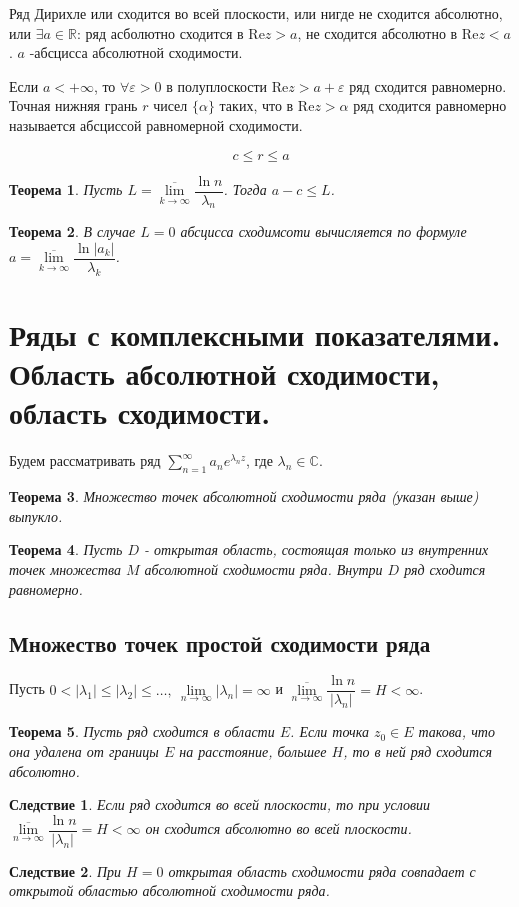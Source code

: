 \documentclass[9pt]{article}
\newtheorem{theorem}{Теорема} %
\newtheorem*{corollary*}{Следствие}
\begin{document}
				Ряд Дирихле или сходится во всей плоскости, или нигде не сходится абсолютно, или $\exists a \in \mathbb{R}$: ряд асболютно сходится в $\mathrm{Re}z > a$, не сходится абсолютно в $\mathrm{Re}z < a$. $a$ -абсцисса абсолютной сходимости.
				
				Если $a < + \infty$, то $\forall \varepsilon > 0$ в полуплоскости $\mathrm{Re}z > a + \varepsilon$ ряд сходится равномерно. Точная нижняя грань $r$ чисел $\{\alpha\}$ таких, что в $\mathrm{Re} z > \alpha$ ряд сходится равномерно называется абсциссой равномерной сходимости. 
				
				$$
					c \leq r \leq a
				$$
				\begin{theorem}
					Пусть $L = \overline{\lim\limits_{k\to\infty}} \dfrac{\ln{n}}{\lambda_n}$. Тогда $a-c \leq L$.
				\end{theorem}
				\begin{theorem}
					В случае $L = 0$ абсцисса сходимсоти вычисляется по формуле $a = \overline{\lim\limits_{k\to\infty}} \dfrac{\ln{|a_k|}}{\lambda_k}$.	
				\end{theorem}
			\section{Ряды с комплексными показателями. Область абсолютной сходимости, область сходимости.}
			Будем рассматривать ряд $\sum\limits_{n=1}^{\infty} a_ne^{\lambda_nz}$, где $\lambda_n \in \mathbb{C}$.
			\begin{theorem}
				Множество точек абсолютной сходимости ряда (указан выше) выпукло.
			\end{theorem}
			\begin{theorem}
				Пусть $D$ - открытая область, состоящая только из внутренних точек множества $M$ абсолютной сходимости ряда. Внутри $D$ ряд сходится равномерно.		
			\end{theorem}
			\subsection*{Множество точек простой сходимости ряда}
				Пусть $0 < |\lambda_1| \leq |\lambda_2| \leq \dots, \ \lim\limits_{n\to\infty} |\lambda_n| = \infty$ и $\overline{\lim\limits_{n\to\infty}} \dfrac{\ln{n}}{|\lambda_n|} = H < \infty$.
				\begin{theorem}
					Пусть ряд сходится в области $E$. Если точка $z_0 \in E$ такова, что она удалена от границы $E$ на расстояние, большее $H$, то в ней ряд сходится абсолютно.
				\end{theorem}
				\begin{corollary*}
					Если ряд сходится во всей плоскости, то при условии $\overline{\lim\limits_{n\to\infty}} \dfrac{\ln{n}}{|\lambda_n|} = H < \infty$ он сходится абсолютно во всей плоскости.
				\end{corollary*}
				\begin{corollary*}
					При $H=0$ открытая область сходимости ряда совпадает с открытой областью абсолютной сходимости ряда.
				\end{corollary*}
\end{document}
